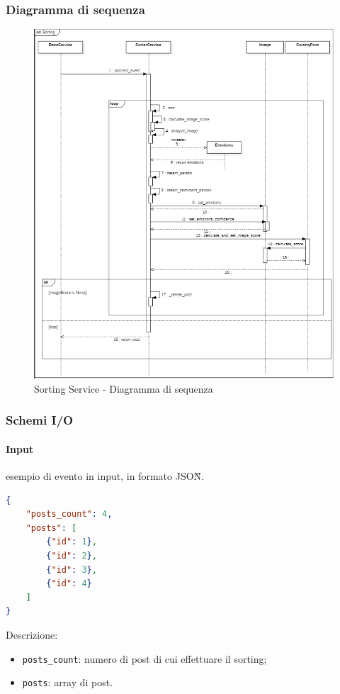 \subsubsection{Diagramma di sequenza}
\begin{figure}[!h]
    \includegraphics[width=15cm]{sezioni/images/sd_sorting.png}
    \caption{Sorting Service - Diagramma di sequenza}
\end{figure}
\subsubsection{Schemi I/O}
\paragraph*{Input} esempio di evento in input, in formato JSON\G{}.
\begin{lstlisting}[language=JSON]
{
    "posts_count": 4,
    "posts": [
        {"id": 1},
        {"id": 2},
        {"id": 3},
        {"id": 4}
    ]
}
\end{lstlisting}
Descrizione:
\begin{itemize}
    \item \verb|posts_count|: numero di post di cui effettuare il sorting;
    \item \verb|posts|: array di post. 
\end{itemize}

